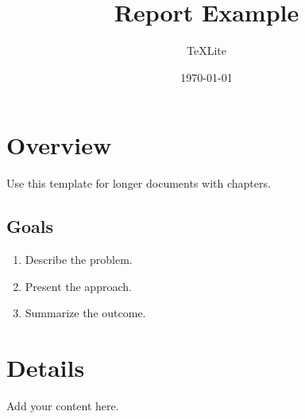 \documentclass[11pt]{report}
\title{Report Example}
\author{TeXLite}
\date{\today}
\begin{document}
\maketitle
\tableofcontents

\chapter{Overview}
Use this template for longer documents with chapters.

\section{Goals}
\begin{enumerate}
    \item Describe the problem.
    \item Present the approach.
    \item Summarize the outcome.
\end{enumerate}

\chapter{Details}
Add your content here.
\end{document}
